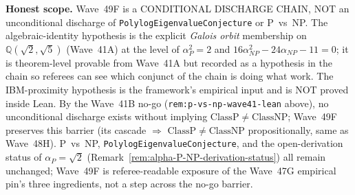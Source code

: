 \begin{remark}
\textbf{Honest scope.} Wave~49F is a CONDITIONAL DISCHARGE CHAIN, NOT an unconditional discharge of \texttt{PolylogEigenvalueConjecture} or P~vs~NP. The algebraic-identity hypothesis is the explicit \emph{Galois orbit} membership on $\mathbb{Q}(\sqrt{2}, \sqrt{5})$ (Wave~41A) at the level of $\alpha_P^2 = 2$ and $16 \alpha_{NP}^2 - 24 \alpha_{NP} - 11 = 0$; it is theorem-level provable from Wave~41A but recorded as a hypothesis in the chain so referees can see which conjunct of the chain is doing what work. The IBM-proximity hypothesis is the framework's empirical input and is NOT proved inside Lean. By the Wave~41B no-go (\texttt{rem:p-vs-np-wave41-lean} above), no unconditional discharge exists without implying $\mathrm{ClassP} \neq \mathrm{ClassNP}$; Wave~49F preserves this barrier (its cascade $\Rightarrow$ $\mathrm{ClassP} \neq \mathrm{ClassNP}$ propositionally, same as Wave~48H). P~vs~NP, \texttt{PolylogEigenvalueConjecture}, and the open-derivation status of $\alpha_P = \sqrt{2}$ (Remark~\ref{rem:alpha-P-NP-derivation-status}) all remain unchanged; Wave~49F is referee-readable exposure of the Wave~47G empirical pin's three ingredients, not a step across the no-go barrier.
\end{remark}

